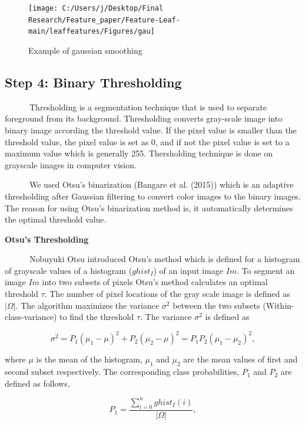 \documentclass{article}
\begin{document}
\begin{figure}[!ht]

{\centering \texttt{[image: C:/Users/j/Desktop/Final Research/Feature\_paper/Feature-Leaf-main/leaffeatures/Figures/gau]} 

}

\caption{\label{figgau}Example of gaussian smoothing}\label{fig:unnamed-chunk-5}
\end{figure}

\hypertarget{step-4-binary-thresholding}{%
\subsection{Step 4: Binary
Thresholding}\label{step-4-binary-thresholding}}

~~~~~~Thresholding is a segmentation technique that is used to separate
foreground from its background. Thresholding converts gray-scale image
into binary image according the threshold value. If the pixel value is
smaller than the threshold value, the pixel value is set as 0, and if
not the pixel value is set to a maximum value which is generally 255.
Thersholding technique is done on grayscale images in computer vision.

~~~~~~We used Otsu's binarization (Bangare et al. (2015)) which is an
adaptive thresholding after Gaussian filtering to convert color images
to the binary images. The reason for using Otsu's binarization method
is, it automatically determines the optimal threshold value.

\textbf{Otsu's Thresholding}

~~~~~~Nobuyuki Otsu introduced Otsu's method which is defined for a
histogram of grayscale values of a histogram (\(ghist_I\)) of an input
image \(Im\). To segment an image \(Im\) into two subsets of pixels
Otsu's method calculates an optimal threshold \(\tau\). The number of
pixel locations of the gray scale image is defined as \(|\Omega|\). The
algorithm maximizes the variance \(\sigma^2\) between the two subsets
(Within-class-variance) to find the threshold \(\tau\). The variance
\(\sigma^2\) is defined as

\[\sigma^2 = P_1(\mu_1-\mu)^2 + P_2(\mu_2-\mu)^2 = P_1P_2(\mu_1-\mu_2)^2, \]

where \(\mu\) is the mean of the histogram, \(\mu_1\) and \(\mu_2\) are
the mean values of first and second subset respectively. The
corresponding class probabilities, \(P_1\) and \(P_2\) are defined as
follows,

\[P_1 = \frac{\sum_{i=0}^{u}ghist_I(i)}{|\Omega|},\]
\end{document}
